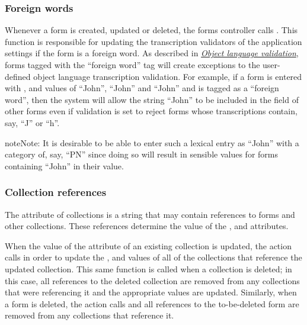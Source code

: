 \documentclass[letterpaper,10pt,english]{sphinxmanual}
\begin{document}
\subsubsection{Foreign words}
\label{interface:foreign-words}
Whenever a form is created, updated or deleted, the forms controller calls
.  This function is responsible
for updating the transcription validators of the application settings if the
form is a foreign word.  As described in {\hyperref[interface:object-language-validation]{\emph{Object language validation}}},
forms tagged with the ``foreign word'' tag will create exceptions to the
user-defined object language transcription validation.  For example, if a form
is entered with ,  and 
values of ``John'', ``John'' and ``John'' and is tagged as a ``foreign word'', then the
system will allow the string ``John'' to be included in the 
field of other forms even if validation is set to reject forms whose
transcriptions contain, say, ``J'' or ``h''.

\begin{notice}{note}{Note:}
It is desirable to be able to enter such a lexical entry as ``John'' with a
category of, say, ``PN'' since doing so will result in sensible
 values for forms containing ``John'' in their
 value.
\end{notice}


\subsubsection{Collection references}
\label{interface:collection-references}
The  attribute of collections is a string that may contain
references to forms and other collections.  These references determine the value
of the ,  and  attributes.

When the value of the  attribute of an existing collection is
updated, the  action calls
 in order to update the
,  and  values of all of the collections
that reference the updated collection.  This same function is called when a
collection is deleted; in this case, all references to the deleted collection
are removed from any collections that were referencing it and the appropriate
values are updated.  Similarly, when a form is deleted, the  action
calls  and all references to the
to-be-deleted form are removed from any collections that reference it.
\end{document}
